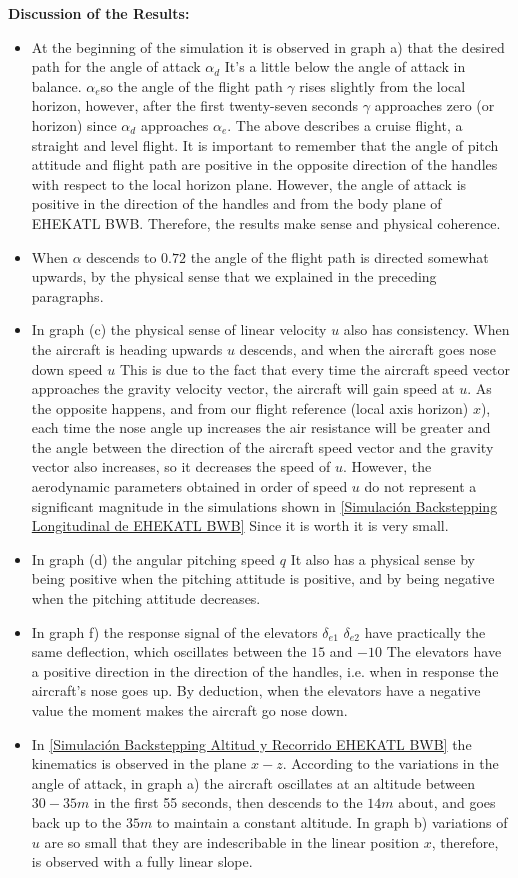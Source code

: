 \textbf{Discussion of the Results:}
\begin{itemize}
    \item At the beginning of the simulation it is observed in graph a) that the desired path for the angle of attack $\alpha_d$ It's a little below the angle of attack in balance. $\alpha_e$so the angle of the flight path $\gamma$ rises slightly from the local horizon, however, after the first twenty-seven seconds $\gamma$ approaches zero (or horizon) since $\alpha_d$ approaches $\alpha_e$. The above describes a cruise flight, a straight and level flight. It is important to remember that the angle of pitch attitude and flight path are positive in the opposite direction of the handles with respect to the local horizon plane. However, the angle of attack is positive in the direction of the handles and from the body plane of EHEKATL BWB. Therefore, the results make sense and physical coherence.
    \item When $\alpha$ descends to $0.72$ the angle of the flight path is directed somewhat upwards, by the physical sense that we explained in the preceding paragraphs.
    \item In graph (c) the physical sense of linear velocity $u$ also has consistency. When the aircraft is heading upwards $u$ descends, and when the aircraft goes nose down speed $u$ This is due to the fact that every time the aircraft speed vector approaches the gravity velocity vector, the aircraft will gain speed at $u$. As the opposite happens, and from our flight reference (local axis horizon) $x$), each time the nose angle up increases the air resistance will be greater and the angle between the direction of the aircraft speed vector and the gravity vector also increases, so it decreases the speed of $u$. However, the aerodynamic parameters obtained in order of speed $u$ do not represent a significant magnitude in the simulations shown in \ref{Simulación Backstepping Longitudinal de EHEKATL BWB} Since it is worth it is very small. 
    \item In graph (d) the angular pitching speed $q$ It also has a physical sense by being positive when the pitching attitude is positive, and by being negative when the pitching attitude decreases. 
    \item In graph f) the response signal of the elevators  $\delta_{e1}$ $\delta_{e2}$ have practically the same deflection, which oscillates between the $15$ and $-10$ The elevators have a positive direction in the direction of the handles, i.e. when in response the aircraft's nose goes up. By deduction, when the elevators have a negative value the moment makes the aircraft go nose down.
    \item In \ref{Simulación Backstepping Altitud y Recorrido EHEKATL BWB} the kinematics is observed in the plane $x-z$. According to the variations in the angle of attack, in graph a) the aircraft oscillates at an altitude between $30-35m$ in the first 55 seconds, then descends to the $14m$ about, and goes back up to the $35m$ to maintain a constant altitude. In graph b) variations of $u$ are so small that they are indescribable in the linear position $x$, therefore, is observed with a fully linear slope. 
\end{itemize}

